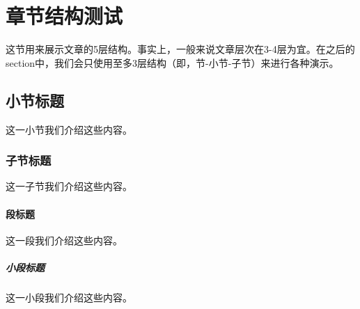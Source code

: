 \section{章节结构测试}这节用来展示文章的5层结构。事实上，一般来说文章层次在3-4层为宜。在之后的section中，我们会只使用至多3层结构（即，节-小节-子节）来进行各种演示。
 
\subsection{小节标题}这一小节我们介绍这些内容。

\subsubsection{子节标题}这一子节我们介绍这些内容。

\paragraph{段标题}这一段我们介绍这些内容。 

\subparagraph{小段标题}这一小段我们介绍这些内容。